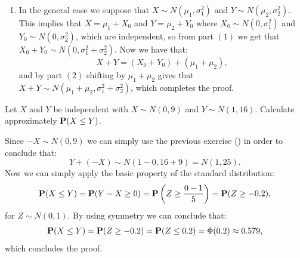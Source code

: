 \documentclass[11pt,a4paper]{article}
\begin{document}
\begin{solution}
\begin{enumerate}
      then:
      \[
        \Prob(W + c \le w) =
        \Prob(W \le w - c),
      \]
      so the density of $W + c$ is clearly $f(w - c)$.
    \item[(3)] In the general case we suppose that $X \sim N(\mu_1,\sigma_1^2)$
      and $Y \sim N(\mu_2,\sigma_2^2)$.
      This implies that $X = \mu_1 + X_0$ and $Y = \mu_2 + Y_0$
      where $X_0 \sim N(0,\sigma_1^2)$ and $Y_0 \sim N(0,\sigma_2^2)$,
      which are independent, so from part $(1)$ we get that
      $X_0 + Y_0 \sim N(0,\sigma_1^2 + \sigma_2^2)$.
      Now we have that:
      \[
        X + Y = (X_0 + Y_0) + (\mu_1 + \mu_2),
      \]
      and by part $(2)$ shifting by $\mu_1 + \mu_2$ gives
      that $X + Y \sim N(\mu_1 + \mu_2, \sigma_1^2 + \sigma_2^2)$,
      which completes the proof.
  \end{enumerate}
\end{solution}

\begin{exercise}
  Let $X$ and $Y$ be independent with $X \sim N(0,9)$ and $Y \sim N(1,16)$. 
  Calculate approximately $\mathbf{P}(X \le Y)$.
\end{exercise}
\begin{solution}
  Since $-X \sim N(0,9)$ we can simply use the previous exercise
  () in order to conclude that:
  \[
    Y + (-X) \sim N(1 - 0, 16 + 9) = N(1,25).
  \]
  Now we can simply apply the basic property of the standard distribution:
  \[
    \Prob(X \le Y) =
    \Prob(Y - X \geq 0) =
    \Prob\del{Z \geq \frac{0 - 1}{5}} =
    \Prob(Z \geq -0.2),
  \]
  for $Z \sim N(0,1)$.
  By using symmetry we can conclude that:
  \[
    \mathbf{P}(X \le Y) =
    \mathbf{P}(Z \geq -0.2) =
    \mathbf{P}(Z \le 0.2) =
    \Phi(0.2) \approx 0.579,
  \]
  which concludes the proof.
\end{solution}
\end{document}
